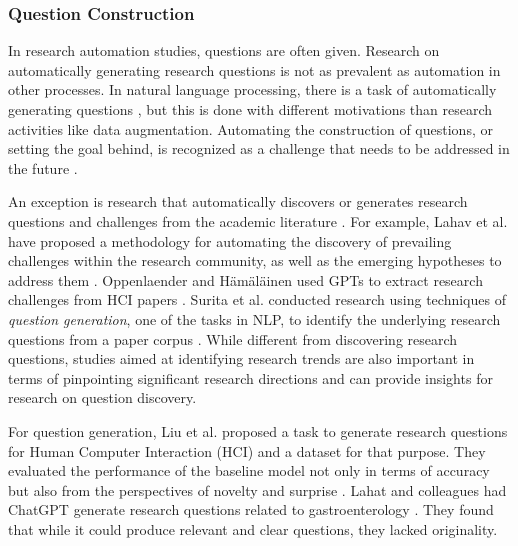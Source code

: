 \documentclass{article}
\begin{document}

\subsubsection{Question Construction}

In research automation studies, questions are often given. Research on automatically generating research questions is not as prevalent as automation in other processes. In natural language processing, there is a task of automatically generating questions \cite{pan2019recent,zhang2021review}, but this is done with different motivations than research activities like data augmentation. Automating the construction of questions, or setting the goal behind, is recognized as a challenge that needs to be addressed in the future \cite{coley2020autonomousII,zenil2023,kitano2021nobel}. 

An exception is research that automatically discovers or generates research questions and challenges from the academic literature \cite{lahav2022search,liu2023creative,oppenlaender2023mapping,surita2020can}. For example, Lahav et al. have proposed a methodology for automating the discovery of prevailing challenges within the research community, as well as the emerging hypotheses to address them \cite{lahav2022search}. Oppenlaender and Hämäläinen used GPTs to extract research challenges from HCI papers \cite{oppenlaender2023mapping}. Surita et al. conducted research using techniques of \textit{question generation}, one of the tasks in NLP, to identify the underlying research questions from a paper corpus \cite{surita2020can}. While different from discovering research questions, studies aimed at identifying research trends \cite{krenn2022scientific,krenn2022predicting} are also important in terms of pinpointing significant research directions and can provide insights for research on question discovery.

For question generation, Liu et al. proposed a task to generate research questions for Human Computer Interaction (HCI) and a dataset for that purpose. They evaluated the performance of the baseline model not only in terms of accuracy but also from the perspectives of novelty and surprise \cite{liu2023creative}. Lahat and colleagues had ChatGPT generate research questions related to gastroenterology \cite{lahat2023evaluating}. They found that while it could produce relevant and clear questions, they lacked originality.
\end{document}
